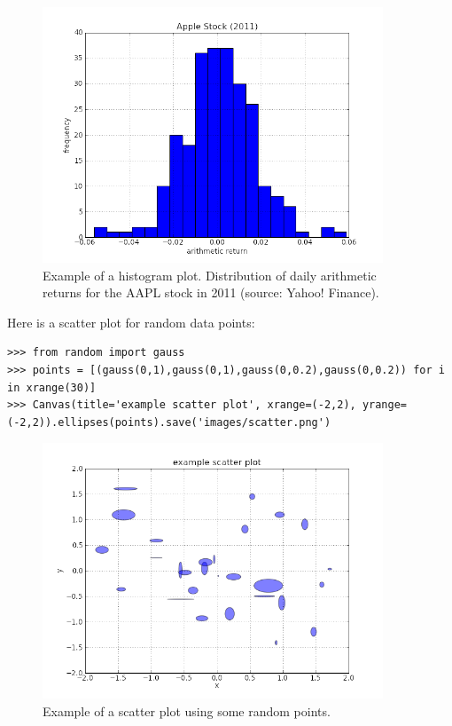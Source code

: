 \documentclass[justified,sixbynine]{tufte-book}
\def\ft{\small\tt}
\theoremstyle{plain}%
\theoremstyle{definition}
\theoremstyle{remark}
\begin{document}
\begin{fullwidth}
\begin{figure}[ht]
\centering\includegraphics[width=4in]{images/aapl2011hist.png}
\caption{Example of a histogram plot. Distribution of daily arithmetic returns for the AAPL stock in 2011 (source: Yahoo! Finance).}
\end{figure}

Here is a scatter plot for random data points:

\begin{lstlisting}[caption={in file: {\ft nlib.py}}]
>>> from random import gauss
>>> points = [(gauss(0,1),gauss(0,1),gauss(0,0.2),gauss(0,0.2)) for i in xrange(30)]
>>> Canvas(title='example scatter plot', xrange=(-2,2), yrange=(-2,2)).ellipses(points).save('images/scatter.png')
\end{lstlisting}

\begin{figure}[ht]
\centering\includegraphics[width=4in]{images/scatter.png}
\caption{Example of a scatter plot using some random points.}
\end{figure}


\end{fullwidth}
\end{document}
